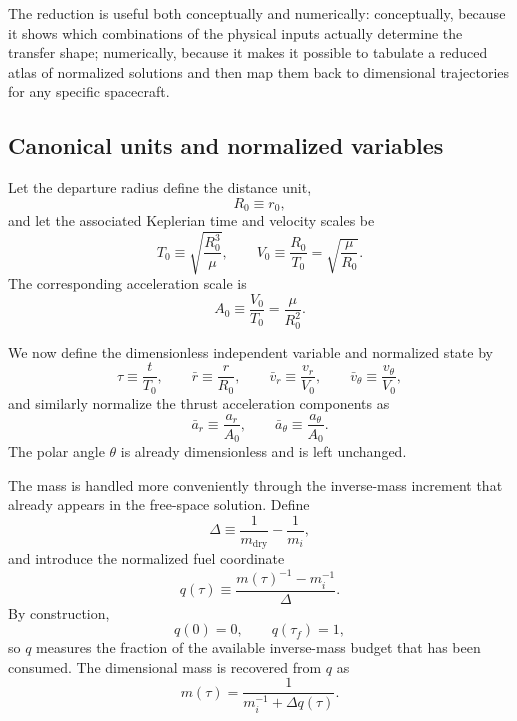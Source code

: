 \documentclass[journal,a4paper]{IEEEtran}
\begin{document}
The reduction is useful both conceptually and numerically: conceptually, because it shows which combinations of the physical inputs actually determine the transfer shape; numerically, because it makes it possible to tabulate a reduced atlas of normalized solutions and then map them back to dimensional trajectories for any specific spacecraft.

\subsection{Canonical units and normalized variables}
Let the departure radius define the distance unit,
\begin{equation}
  R_0 \equiv r_0,
\end{equation}
and let the associated Keplerian time and velocity scales be
\begin{equation}
  T_0 \equiv \sqrt{\frac{R_0^3}{\mu}},
  \qquad
  V_0 \equiv \frac{R_0}{T_0} = \sqrt{\frac{\mu}{R_0}}.
\end{equation}
The corresponding acceleration scale is
\begin{equation}
  A_0 \equiv \frac{V_0}{T_0} = \frac{\mu}{R_0^2}.
\end{equation}

We now define the dimensionless independent variable and normalized state by
\begin{equation}
  \tau \equiv \frac{t}{T_0},
  \qquad
  \bar r \equiv \frac{r}{R_0},
  \qquad
  \bar v_r \equiv \frac{v_r}{V_0},
  \qquad
  \bar v_\theta \equiv \frac{v_\theta}{V_0},
\end{equation}
and similarly normalize the thrust acceleration components as
\begin{equation}
  \bar a_r \equiv \frac{a_r}{A_0},
  \qquad
  \bar a_\theta \equiv \frac{a_\theta}{A_0}.
\end{equation}
The polar angle \(\theta\) is already dimensionless and is left unchanged.

The mass is handled more conveniently through the inverse-mass increment that already appears in the free-space solution.
Define
\begin{equation}
  \Delta \equiv \frac{1}{m_\mathrm{dry}}-\frac{1}{m_i},
\end{equation}
and introduce the normalized fuel coordinate
\begin{equation}
  q(\tau) \equiv \frac{m(\tau)^{-1}-m_i^{-1}}{\Delta}.
  \label{eq:q_def_similarity}
\end{equation}
By construction,
\begin{equation}
  q(0)=0,
  \qquad
  q(\tau_f)=1,
\end{equation}
so \(q\) measures the fraction of the available inverse-mass budget that has been consumed.
The dimensional mass is recovered from \(q\) as
\begin{equation}
  m(\tau)=\frac{1}{m_i^{-1}+\Delta q(\tau)}.
  \label{eq:m_from_q_similarity}
\end{equation}
\end{document}
